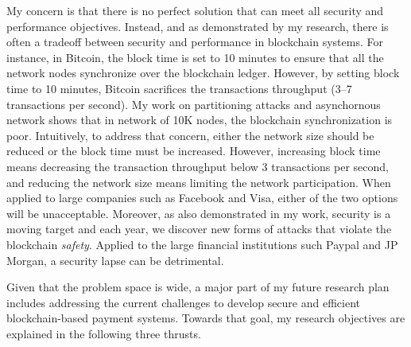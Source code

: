 \documentclass{NSF}
\begin{document}
My concern is that there is no perfect solution that can meet all security and performance objectives. Instead, and as demonstrated by my research, there is often a tradeoff between security and performance in blockchain systems. For instance, in Bitcoin, the block time is set to 10 minutes to ensure that all the network nodes synchronize over the blockchain ledger. However, by setting block time to 10 minutes, Bitcoin sacrifices the transactions throughput (3--7 transactions per second). My work on partitioning attacks and asynchornous network shows that in network of 10K nodes, the blockchain synchronization is poor. Intuitively, to address that concern, either the network size should be reduced or the block time must be increased. However, increasing block time means decreasing the transaction throughput below 3 transactions per second, and reducing the network size means limiting the network participation. When applied to large companies such as Facebook and Visa, either of the two options will be unacceptable. Moreover, as also demonstrated in my work, security is a moving target and each year, we discover new forms of attacks that violate the blockchain {\em safety}. Applied to the large financial institutions such Paypal and JP Morgan, a security lapse can be detrimental. 


Given that the problem space is wide, a major part of my future research plan includes addressing the current challenges to develop secure and efficient blockchain-based payment systems. Towards that goal, my research objectives are explained in the following three thrusts. 
\end{document}
